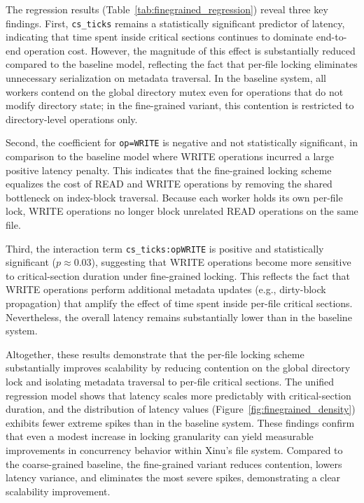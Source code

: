 \documentclass[sigconf]{acmart}
\begin{document}
The regression results (Table~\ref{tab:finegrained_regression}) reveal three key findings. First, \texttt{cs\_ticks} remains a statistically
significant predictor of latency, indicating that time spent inside critical sections continues to dominate end-to-end operation cost. However, the magnitude of this effect is substantially reduced compared to the baseline model, reflecting the fact that per-file locking eliminates unnecessary serialization on metadata traversal. In the baseline system, all workers contend on the global directory
mutex even for operations that do not modify directory state; in the fine-grained variant, this contention is restricted to directory-level operations only.

Second, the coefficient for \texttt{op=WRITE} is negative and not statistically significant, in comparison to the baseline model where WRITE operations incurred a large positive latency penalty. This indicates that the fine-grained locking scheme equalizes the cost of READ and WRITE operations by removing the shared bottleneck on index-block traversal. Because each worker holds its own per-file lock, WRITE operations no longer block unrelated READ operations on the same file.

Third, the interaction term \texttt{cs\_ticks:opWRITE} is positive and statistically significant ($p \approx 0.03$), suggesting that WRITE operations become more sensitive to critical-section duration under fine-grained locking. This reflects the fact that WRITE operations perform additional metadata updates (e.g., dirty-block propagation)
that amplify the effect of time spent inside per-file critical sections. Nevertheless, the overall latency remains substantially lower than in the baseline system.

Altogether, these results demonstrate that the per-file locking scheme substantially improves scalability by reducing contention on the global directory lock and isolating metadata traversal to per-file critical sections. The unified regression model shows that latency scales more predictably with critical-section duration, and the distribution of latency values (Figure~\ref{fig:finegrained_density})
exhibits fewer extreme spikes than in the baseline system. These findings confirm that even a modest increase in locking granularity can yield measurable improvements in concurrency behavior within Xinu's file system. Compared to the coarse-grained baseline, the fine-grained variant reduces contention, lowers latency variance, and eliminates the most severe spikes, demonstrating a clear scalability improvement.
\end{document}
